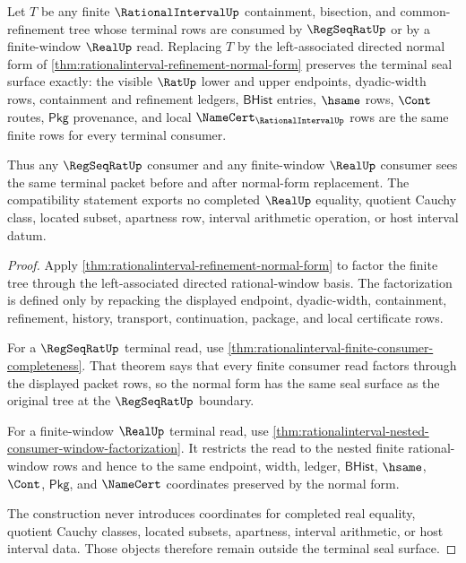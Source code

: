 \begin{theorem}
\label{thm:rationalinterval-normal-form-terminal-seal-compatibility}
Let $T$ be any finite $\RationalIntervalUp$ containment, bisection, and
common-refinement tree whose terminal rows are consumed by $\RegSeqRatUp$ or by
a finite-window $\RealUp$ read. Replacing $T$ by the left-associated directed
normal form of \autoref{thm:rationalinterval-refinement-normal-form} preserves
the terminal seal surface exactly: the visible $\RatUp$ lower and upper
endpoints, dyadic-width rows, containment and refinement ledgers,
$\mathsf{BHist}$ entries, $\hsame$ rows, $\Cont$ routes, $\mathsf{Pkg}$
provenance, and local $\NameCert_{\RationalIntervalUp}$ rows are the same
finite rows for every terminal consumer.

Thus any $\RegSeqRatUp$ consumer and any finite-window $\RealUp$ consumer sees
the same terminal packet before and after normal-form replacement. The
compatibility statement exports no completed $\RealUp$ equality, quotient
Cauchy class, located subset, apartness row, interval arithmetic operation, or
host interval datum.
\end{theorem}
\begin{proof}
Apply \autoref{thm:rationalinterval-refinement-normal-form} to factor the
finite tree through the left-associated directed rational-window basis. The
factorization is defined only by repacking the displayed endpoint,
dyadic-width, containment, refinement, history, transport, continuation,
package, and local certificate rows.

For a $\RegSeqRatUp$ terminal read, use
\autoref{thm:rationalinterval-finite-consumer-completeness}. That theorem says
that every finite consumer read factors through the displayed packet rows, so
the normal form has the same seal surface as the original tree at the
$\RegSeqRatUp$ boundary.

For a finite-window $\RealUp$ terminal read, use
\autoref{thm:rationalinterval-nested-consumer-window-factorization}. It
restricts the read to the nested finite rational-window rows and hence to the
same endpoint, width, ledger, $\mathsf{BHist}$, $\hsame$, $\Cont$,
$\mathsf{Pkg}$, and $\NameCert$ coordinates preserved by the normal form.

The construction never introduces coordinates for completed real equality,
quotient Cauchy classes, located subsets, apartness, interval arithmetic, or
host interval data. Those objects therefore remain outside the terminal seal
surface.
\end{proof}

